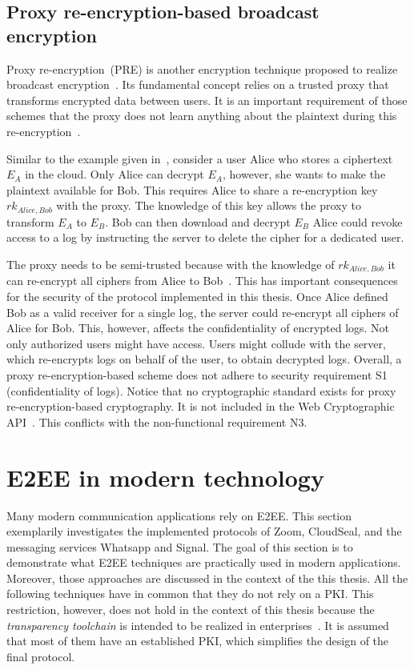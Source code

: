 \documentclass[../main.tex]{subfiles}
\begin{document}
\subsection{Proxy re-encryption-based broadcast encryption}
\label{sec:broadcast-proxy}
Proxy re-encryption~(PRE) is another encryption technique proposed to realize broadcast encryption~\cite{Hagg2022}.
Its fundamental concept relies on a trusted proxy that transforms encrypted data between users.
It is an important requirement of those schemes that the proxy does not learn anything about the plaintext during this re-encryption~\cite{Chen2018}.

Similar to the example given in~\cite{Hagg2022}, consider a user Alice who stores a ciphertext $E_A$ in the cloud.
Only Alice can decrypt $E_A$, however, she wants to make the plaintext available for Bob.
This requires Alice to share a re-encryption key $rk_{Alice,Bob}$ with the proxy.
The knowledge of this key allows the proxy to transform $E_A$ to $E_B$.
Bob can then download and decrypt $E_B$
Alice could revoke access to a log by instructing the server to delete the cipher for a dedicated user.

The proxy needs to be semi-trusted because with the knowledge of $rk_{Alice,Bob}$ it can re-encrypt all ciphers from Alice to Bob~\cite{Chen2018}.
This has important consequences for the security of the protocol implemented in this thesis.
Once Alice defined Bob as a valid receiver for a single log, the server could re-encrypt all ciphers of Alice for Bob.
This, however, affects the confidentiality of encrypted logs.
Not only authorized users might have access.
Users might collude with the server, which re-encrypts logs on behalf of the user, to obtain decrypted logs.
Overall, a proxy re-encryption-based scheme does not adhere to security requirement S1 (confidentiality of logs).
Notice that no cryptographic standard exists for proxy re-encryption-based cryptography.
It is not included in the Web Cryptographic API~\cite{WebCryptoApi2017}.
This conflicts with the non-functional requirement N3.

\section{E2EE in modern technology}
\label{sec:modern-e2ee}

Many modern communication applications rely on E2EE. 
This section exemplarily investigates the implemented protocols of Zoom, CloudSeal, and the messaging services Whatsapp and Signal.
The goal of this section is to demonstrate what E2EE techniques are practically used in modern applications.
Moreover, those approaches are discussed in the context of the this thesis.
All the following techniques have in common that they do not rely on a PKI.
This restriction, however, does not hold in the context of this thesis because the \emph{transparency toolchain} is intended to be realized in enterprises~\cite{Zieglmeier2021}.
It is assumed that most of them have an established PKI, which simplifies the design of the final protocol.
\end{document}
